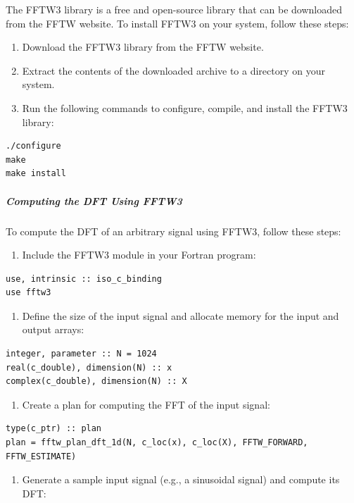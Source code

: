 The FFTW3 library is a free and open-source library that can be downloaded from the FFTW website. To install FFTW3 on your system, follow these steps:

\begin{enumerate}
\item Download the FFTW3 library from the FFTW website.
\item Extract the contents of the downloaded archive to a directory on your system.
\item Run the following commands to configure, compile, and install the FFTW3 library:
\end{enumerate}

\begin{verbatim}
./configure
make
make install
\end{verbatim}

\subparagraph{Computing the DFT Using FFTW3}

To compute the DFT of an arbitrary signal using FFTW3, follow these steps:

\begin{enumerate}
\item Include the FFTW3 module in your Fortran program:
\end{enumerate}

\begin{verbatim}
use, intrinsic :: iso_c_binding
use fftw3
\end{verbatim}

\begin{enumerate}[resume]
\item Define the size of the input signal and allocate memory for the input and output arrays:
\end{enumerate}

\begin{verbatim}
integer, parameter :: N = 1024
real(c_double), dimension(N) :: x
complex(c_double), dimension(N) :: X
\end{verbatim}

\begin{enumerate}[resume]
\item Create a plan for computing the FFT of the input signal:
\end{enumerate}

\begin{verbatim}
type(c_ptr) :: plan
plan = fftw_plan_dft_1d(N, c_loc(x), c_loc(X), FFTW_FORWARD, FFTW_ESTIMATE)
\end{verbatim}

\begin{enumerate}[resume]
\item Generate a sample input signal (e.g., a sinusoidal signal) and compute its DFT:
\end{enumerate}

